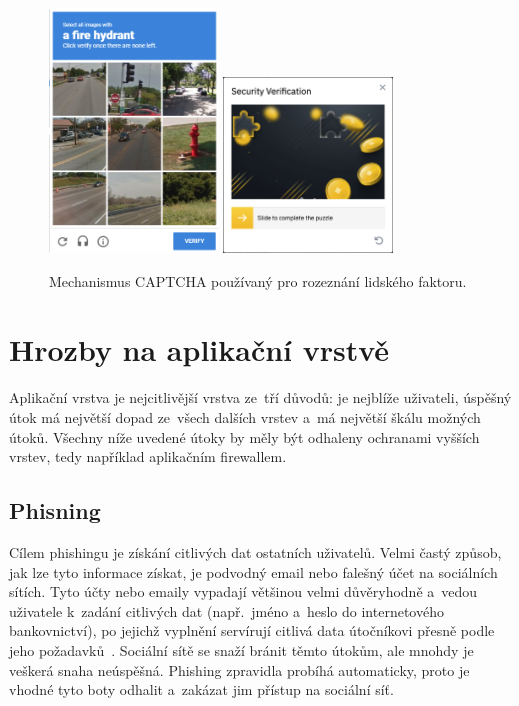 \begin{figure}[hbt]
	\centering
	\includegraphics[width=0.4\textwidth]{images/captcha.png}
	\hspace{2em}
	\includegraphics[width=0.4\textwidth]{images/captcha2.png}
	\caption{Mechanismus CAPTCHA používaný pro rozeznání lidského faktoru.}
	\label{img:captcha}
\end{figure}

\section{Hrozby na aplikační vrstvě}
Aplikační vrstva je nejcitlivější vrstva ze~tří důvodů: je nejblíže uživateli, úspěšný útok má největší dopad ze~všech dalších vrstev a~má největší škálu možných útoků. Všechny níže uvedené útoky by měly být odhaleny ochranami vyšších vrstev, tedy například aplikačním firewallem.

\subsection*{Phisning}
Cílem phishingu je získání citlivých dat ostatních uživatelů. Velmi častý způsob, jak lze tyto informace získat, je podvodný email nebo falešný účet na sociálních sítích. Tyto účty nebo emaily vypadají většinou velmi důvěryhodně a~vedou uživatele k~zadání citlivých dat (např.~jméno a~heslo do internetového bankovnictví), po jejichž vyplnění servírují citlivá data útočníkovi přesně podle jeho požadavků~\cite{bib:kyber_utoky}. Sociální sítě se snaží bránit těmto útokům, ale mnohdy je veškerá snaha neúspěšná. Phishing zpravidla probíhá automaticky, proto je vhodné tyto boty odhalit a~zakázat jim přístup na sociální síť.

